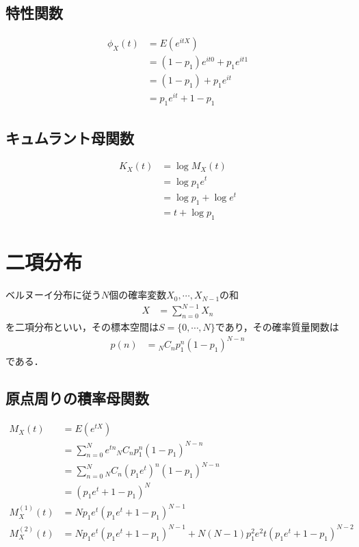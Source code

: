 \documentclass[dvipdfmx]{jsarticle}
\begin{document}
 \subsection{特性関数}
 \begin{align}
  \phi_X\left(t\right)&=E\left(e^{itX}\right)\nonumber\\
  &=\left(1-p_1\right)e^{it0}+p_1e^{it1}\nonumber\\
  &=\left(1-p_1\right)+p_1e^{it}\nonumber\\
  &=p_1e^{it}+1-p_1
 \end{align}
 \subsection{キュムラント母関数}
 \begin{align}
  K_X\left(t\right)&=\log M_X\left(t\right)\nonumber\\
  &=\log p_1e^t\nonumber\\
  &=\log p_1+\log e^t\nonumber\\
  &=t+\log p_1
 \end{align}
 \section{二項分布}
ベルヌーイ分布に従う$N$個の確率変数$X_0,\cdots,X_{N-1}$の和
 \begin{align}
  X&=\sum_{n=0}^{N-1} X_n
 \end{align}
を二項分布といい，その標本空間は$S=\{0,\cdots,N\}$であり，その確率質量関数は
 \begin{align}
  p\left(n\right)&={}_NC_np_1^n\left(1-p_1\right)^{N-n}
 \end{align}
である．
 \subsection{原点周りの積率母関数}
 \begin{align}
  M_X\left(t\right)&=E\left(e^{tX}\right)\nonumber\\
  &=\sum_{n=0}^Ne^{tn}{}_NC_np_1^n\left(1-p_1\right)^{N-n}\nonumber\\
  &=\sum_{n=0}^N{}_NC_n\left(p_1e^t\right)^n\left(1-p_1\right)^{N-n}\nonumber\\
  &=\left(p_1e^t+1-p_1\right)^N\\
  M_X^{\left(1\right)}\left(t\right)&=Np_1e^t\left(p_1e^t+1-p_1\right)^{N-1}\\
  M_X^{\left(2\right)}\left(t\right)&=Np_1e^t\left(p_1e^t+1-p_1\right)^{N-1}+N\left(N-1\right)p_1^2e^2t\left(p_1e^t+1-p_1\right)^{N-2}
 \end{align}
\end{document}
